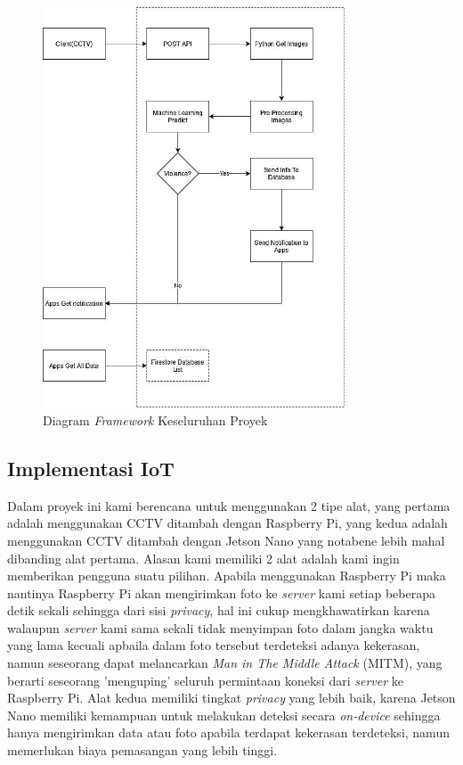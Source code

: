 \begin{figure} [!ht]
  \centering
  \includegraphics[width=0.8\textwidth]{gambar/framework.jpg}
  \caption{Diagram \textit{Framework} Keseluruhan Proyek}
  \label{fig:framework}
\end{figure}

\subsection{Implementasi IoT}

Dalam proyek ini kami berencana untuk menggunakan 2 tipe alat, yang pertama adalah menggunakan CCTV ditambah dengan Raspberry Pi, yang kedua adalah menggunakan CCTV ditambah dengan Jetson Nano yang notabene lebih mahal dibanding alat pertama. Alasan kami memiliki 2 alat adalah kami ingin memberikan pengguna suatu pilihan. Apabila menggunakan Raspberry Pi maka nantinya Raspberry Pi akan mengirimkan foto ke \textit{server} kami setiap beberapa detik sekali sehingga dari sisi \textit{privacy}, hal ini cukup mengkhawatirkan karena walaupun \textit{server} kami sama sekali tidak menyimpan foto dalam jangka waktu yang lama kecuali apbaila dalam foto tersebut terdeteksi adanya kekerasan, namun seseorang dapat melancarkan \textit{Man in The Middle Attack} (MITM), yang berarti seseorang 'menguping' seluruh permintaan koneksi dari \textit{server} ke Raspberry Pi. Alat kedua memiliki tingkat \textit{privacy} yang lebih baik, karena Jetson Nano memiliki kemampuan untuk melakukan deteksi secara \textit{on-device} sehingga hanya mengirimkan data atau foto apabila terdapat kekerasan terdeteksi, namun memerlukan biaya pemasangan yang lebih tinggi.

